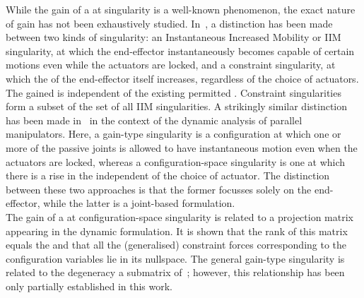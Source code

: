 \documentclass[DD]{iitmdiss}
\newcommand{\mcite}[1]{\cite{#1}}
\begin{document}
While the gain of a \dof at singularity is a well-known phenomenon, the exact nature of gain has not been exhaustively studied. In~\mcite{zlatanov2002b}, a distinction has been made between two kinds of singularity: an Instantaneous Increased Mobility or IIM singularity, at which the end-effector instantaneously becomes capable of certain motions even while the actuators are locked, and a constraint singularity, at which the \dof of the end-effector itself increases, regardless of the choice of actuators. The gained \dof is independent of the existing permitted \dofs. Constraint singularities form a subset of the set of all IIM singularities. A strikingly similar distinction has been made in~\mcite{muralidharan2018} in the context of the dynamic analysis of parallel manipulators. Here, a gain-type singularity is a configuration at which one or more of the passive joints is allowed to have instantaneous motion even when the actuators are locked, whereas a configuration-space singularity is one at which there is a rise in the \dof independent of the choice of actuator. The distinction between these two approaches is that the former focusses solely on the end-effector, while the latter is a joint-based formulation.\\
The gain of a \dof at configuration-space singularity is related to a projection matrix appearing in the dynamic formulation. It is shown that the rank of this matrix equals the \dof and that all the (generalised) constraint forces corresponding to the configuration variables lie in its nullspace. The general gain-type singularity is related to the degeneracy a submatrix of~\bB; however, this relationship has been only partially established in this work. 
\end{document}
